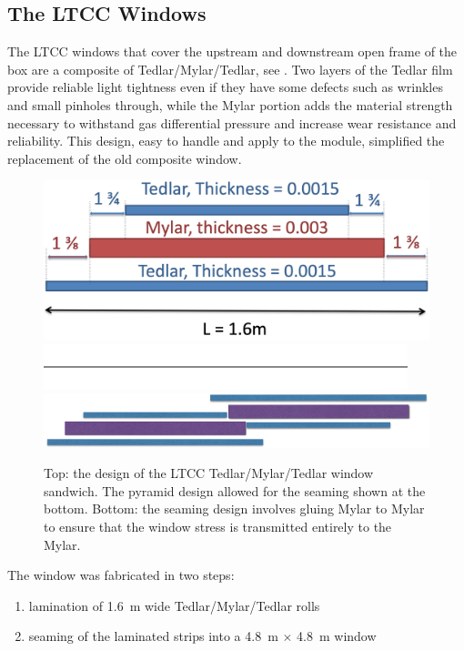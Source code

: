 \subsection{The LTCC Windows}

The LTCC windows that cover the upstream and downstream open frame of the box are a composite of
Tedlar/Mylar/Tedlar, see . Two layers of the Tedlar film provide reliable light tightness
even if they have some defects such as wrinkles and small pinholes through, while the Mylar portion
adds the material strength necessary to withstand gas differential pressure and increase wear resistance
and reliability. This design, easy to handle and apply to the module,
simplified the replacement of the old composite window.

\begin{figure}[!ht]
	\centering
	\includegraphics[width=0.98\columnwidth, keepaspectratio]{img/windowDesign.png}
	\includegraphics[width=0.98\columnwidth, height=0.1\columnwidth]{img/blank.png}
	\includegraphics[width=0.98\columnwidth, keepaspectratio]{img/windowSeaming.png}
	\caption{Top: the design of the LTCC Tedlar/Mylar/Tedlar window sandwich. The pyramid design allowed for the
          seaming shown at the bottom. Bottom: the seaming design involves gluing Mylar to Mylar to ensure that the window
          stress is transmitted entirely to the Mylar.}
	\label{fig:windowDesign}
\end{figure}


The window was fabricated in two steps:

\begin{enumerate}
	\item lamination of 1.6~m wide Tedlar/Mylar/Tedlar rolls
	\item seaming of the laminated strips into a 4.8~m $\times$ 4.8~m window
\end{enumerate}

